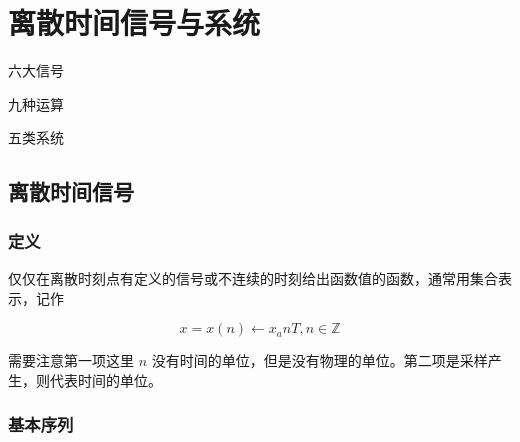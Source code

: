 \documentclass[cn,11pt,chinese,black,simple]{../elegantbook}
\begin{document}
\fi 
\def\chapname{01discretetimeandsys}

\chapter{离散时间信号与系统}

\begin{introduction}
    \item 六大信号
    \item 九种运算
    \item 五类系统
\end{introduction}

\section{离散时间信号}

\subsection{定义}

\begin{definition}
    仅仅在离散时刻点有定义的信号或不连续的时刻给出函数值的函数，通常用集合表示，记作 

    \[x = {x(n)} \leftarrow {x_a{nT}}, n \in \mathbb{Z}\]

    需要注意第一项这里 \(n\) 没有时间的单位，但是没有物理的单位。第二项是采样产生，则代表时间的单位。
\end{definition}

\subsection{基本序列}
\end{document}
